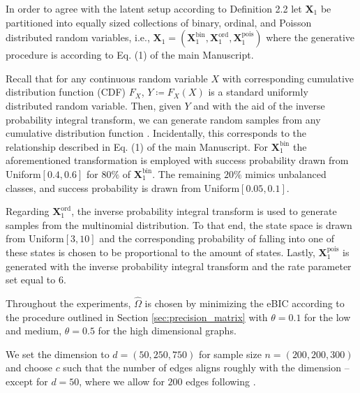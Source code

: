 In order to agree with the latent setup according to Definition 2.2
let $\mathbf{X}_1$ be partitioned into equally sized collections of binary, ordinal, and Poisson distributed random variables, i.e., $\mathbf{X}_1 = (\mathbf{X}_1^{\text{bin}}, \mathbf{X}_1^{\text{ord}},\mathbf{X}_1^{\text{pois}})$ where the generative procedure is according to Eq. (1) of the main Manuscript. %

Recall that for any continuous random variable $X$ with corresponding cumulative distribution function (CDF) $F_X$, $Y \coloneqq F_X(X)$ is a standard uniformly distributed random variable. Then, given $Y$ and with the aid of the inverse probability integral transform, we can generate random samples from any cumulative distribution function \citep{Angus94}. Incidentally, this corresponds to the relationship described in Eq. (1) of the main Manuscript.
For $\mathbf{X}_1^{\text{bin}}$ the aforementioned transformation is employed with success probability drawn from Uniform$[0.4,0.6]$ for $80\%$ of $\mathbf{X}_1^{\text{bin}}$. The remaining $20\%$ mimics unbalanced classes, and success probability is drawn from Uniform$[0.05,0.1]$.

Regarding $\mathbf{X}_1^{\text{ord}}$, the inverse probability integral transform is used to generate samples from the multinomial distribution. To that end, the state space is drawn from Uniform$[3,10]$ and the corresponding probability of falling into one of these states is chosen to be proportional to the amount of states. Lastly, $\mathbf{X}_1^{\text{pois}}$ is generated with the inverse probability integral transform and the rate parameter set equal to $6$.


Throughout the experiments, $\hat{\Omega}$ is chosen by minimizing the eBIC according to the procedure outlined in Section \ref{sec:precision_matrix} with $\theta = 0.1$ for the low and medium, $\theta = 0.5$ for the high dimensional graphs.

We set the dimension to $d = (50, 250, 750)$ for sample size $n = (200, 200, 300)$ and choose $c$ such that the number of edges aligns roughly with the dimension -- except for $d = 50$, where we allow for $200$ edges following \citet{Fan17}.

